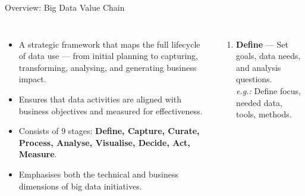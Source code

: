 \documentclass[aspectratio=169, table]{beamer}
\begin{document}
	
	\begin{frame}[fragile]{Overview: Big Data Value Chain}
		\vspace{20pt}
		\begin{columns}[T]
			\begin{itemize}
				\item A strategic framework that maps the full lifecycle of data use — from initial planning to capturing, transforming, analysing, and generating business impact.
				\item Ensures that data activities are aligned with business objectives and measured for effectiveness.
				\item Consists of 9 stages: \textbf{Define, Capture, Curate, Process, Analyse, Visualise, Decide, Act, Measure}.
				\item Emphasises both the technical and business dimensions of big data initiatives.
			\end{itemize}
			
			\begin{enumerate}
				\item \textbf{Define} — Set goals, data needs, and analysis questions.\\
				\textit{e.g.:} Define focus, needed data, tools, methods.
			\end{enumerate}
		\end{columns}
	\end{frame}
	
\end{document}
